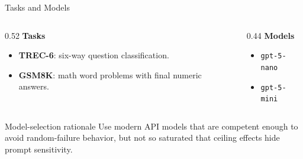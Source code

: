 \documentclass[aspectratio=169,11pt]{beamer}
\newcommand{\smallgap}{\vspace{0.35em}}
\begin{document}
\begin{frame}{Tasks and Models}
  \begin{columns}[T]
    \begin{column}{0.52\linewidth}
      \textbf{Tasks}
      \smallgap
      \begin{itemize}
        \item \textbf{TREC-6}: six-way question classification.
        \item \textbf{GSM8K}: math word problems with final numeric answers.
      \end{itemize}
    \end{column}
    \begin{column}{0.44\linewidth}
      \textbf{Models}
      \smallgap
      \begin{itemize}
        \item \texttt{gpt-5-nano}
        \item \texttt{gpt-5-mini}
      \end{itemize}
    \end{column}
  \end{columns}

  \vspace{1em}
  \begin{block}{Model-selection rationale}
    Use modern API models that are competent enough to avoid random-failure behavior, but not so saturated that ceiling effects hide prompt sensitivity.
  \end{block}
\end{frame}
\end{document}
